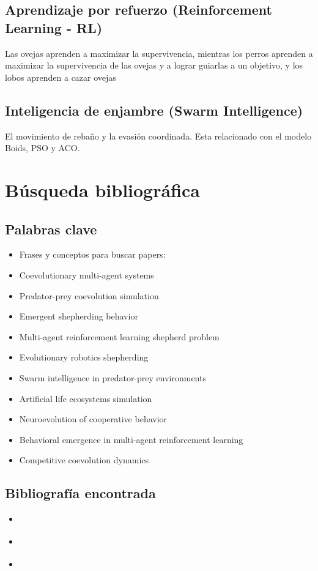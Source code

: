 \documentclass[final]{article}
\begin{document}
\subsection{Aprendizaje por refuerzo (Reinforcement Learning - RL)}
Las ovejas aprenden a maximizar la supervivencia, mientras los perros aprenden a maximizar la supervivencia de las ovejas y a lograr
guiarlas a un objetivo, y los lobos aprenden a cazar ovejas

\subsection{Inteligencia de enjambre (Swarm Intelligence)}
El movimiento de rebaño y la evasión coordinada. Esta relacionado con el modelo Boids, PSO y ACO.

\section{Búsqueda bibliográfica}

\subsection{Palabras clave}
\begin{itemize}
    \item Frases y conceptos para buscar papers:
    \item Coevolutionary multi-agent systems
    \item Predator-prey coevolution simulation
    \item Emergent shepherding behavior
    \item Multi-agent reinforcement learning shepherd problem
    \item Evolutionary robotics shepherding
    \item Swarm intelligence in predator-prey environments
    \item Artificial life ecosystems simulation
    \item Neuroevolution of cooperative behavior
    \item Behavioral emergence in multi-agent reinforcement learning
    \item Competitive coevolution dynamics
\end{itemize}

\subsection{Bibliografía encontrada}

\begin{itemize}
    \item \citet{SankarShepherding}
    \item \citet{NapolitanoShepherding}
    \item \citet{CovoneShepherding}
\end{itemize}



\end{document}
